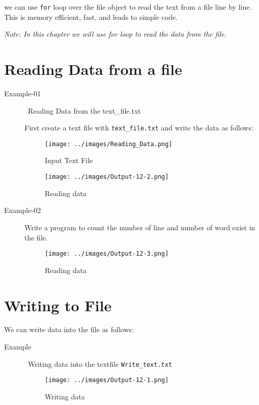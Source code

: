 \documentclass{book}
\begin{document}
we can use \texttt{for} loop over the file object to read the text from a file line by line. This is memory efficient, fast, and leads to simple code. 

\emph{Note: In this chapter we will use for loop to read the data from the file.}

\section*{Reading Data from a file}

\begin{description}
\item[Example-01 ]\ Reading Data from the text\_file.txt

First create a text file with \texttt{text\_file.txt} and write the data as follows:

\begin{figure}[ht]
\begin{center}
\texttt{[image: ../images/Reading\_Data.png]}
\caption{Input Text File}
\label{Input Text File}
\end{center}
\end{figure}



\begin{figure}[ht]
\begin{center}
\texttt{[image: ../images/Output-12-2.png]}
\caption{Reading data}
\label{Reading data}
\end{center}
\end{figure}

\item [Example-02 ] Write a program to count the number of line and number of word exist in the file.


\begin{figure}[ht]
\begin{center}
\texttt{[image: ../images/Output-12-3.png]}
\caption{Reading data}
\label{Reading data}
\end{center}
\end{figure}
\end{description}

\section{Writing to File}
We can write data into the file as follows:
\begin{description}
\item[Example ]\ Writing data into the textfile \texttt{Write\_text.txt}


\begin{figure}[ht]
\begin{center}
\texttt{[image: ../images/Output-12-1.png]}
\caption{Writing data}
\label{Writing data}
\end{center}
\end{figure}
\end{description}
\end{document}
